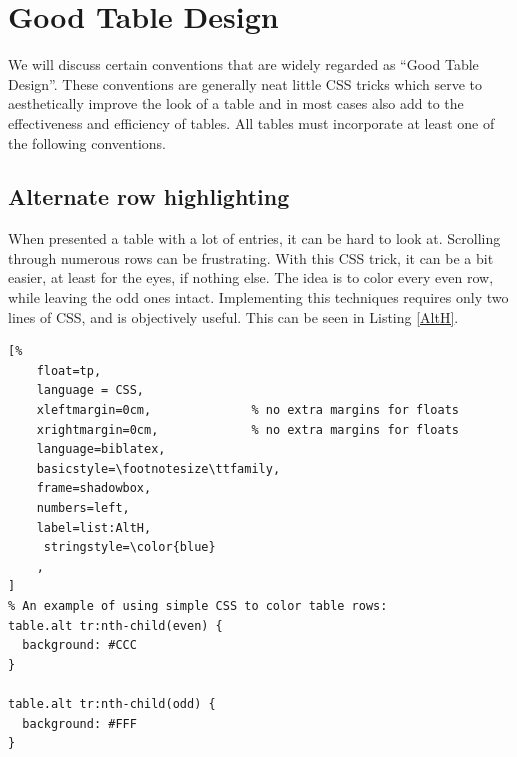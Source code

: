 %
%
%
%
%

\chapter{Good Table Design}
\label{chap:gtd}

We will discuss certain conventions that are widely regarded as ``Good
Table Design''. These conventions are generally neat little CSS tricks
which serve to aesthetically improve the look of a table and in most
cases also add to the effectiveness and efficiency of tables. All tables
must incorporate at least one of the following conventions.


\section{Alternate row highlighting}
When presented a table with a lot of entries, it can be hard to look at.
Scrolling through numerous rows can be frustrating. With this CSS trick,
it can be a bit easier, at least for the eyes, if nothing else. The idea
is to color every even row, while leaving the odd ones intact.
Implementing this techniques requires only two lines of CSS, and is
objectively useful. This can be seen in Listing \ref{AltH}.


\begin{lstlisting}[%
    float=tp,
    language = CSS,
    xleftmargin=0cm,              % no extra margins for floats
    xrightmargin=0cm,             % no extra margins for floats
    language=biblatex,
    basicstyle=\footnotesize\ttfamily,
    frame=shadowbox,
    numbers=left,
    label=list:AltH,
     stringstyle=\color{blue}
    ,
]
% An example of using simple CSS to color table rows:
table.alt tr:nth-child(even) {
  background: #CCC
}

table.alt tr:nth-child(odd) {
  background: #FFF
}
\end{lstlisting}


